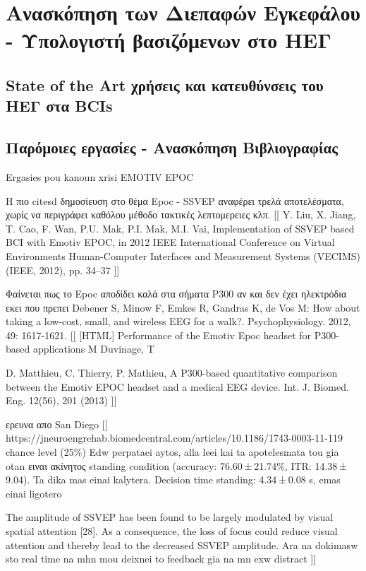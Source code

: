 \documentclass[11pt,a4paper,english,greek,twoside]{../Thesis}
\begin{document}
\chapter{Ανασκόπηση των Διεπαφών Εγκεφάλου - Υπολογιστή βασιζόμενων στο ΗΕΓ} \label{chap:survey}
\section{State of the Art χρήσεις και κατευθύνσεις του ΗΕΓ στα BCIs}

\section{Παρόμοιες εργασίες - Ανασκόπηση Βιβλιογραφίας}

Ergasies pou kanoun xrisi EMOTIV EPOC

Η πιο citesd δημοσίευση στο θέμα Epoc - SSVEP αναφέρει τρελά αποτελέσματα, χωρίς να περιγράφει καθόλου μέθοδο τακτικές λεπτομερειες κλπ.
[[
Y. Liu, X. Jiang, T. Cao, F. Wan, P.U. Mak, P.I. Mak, M.I. Vai, Implementation of SSVEP based BCI with Emotiv EPOC, in 2012 IEEE International Conference on Virtual Environments Human-Computer Interfaces and Measurement Systems (VECIMS) (IEEE, 2012), pp. 34–37
]]

Φαίνεται πως το Epoc αποδίδει καλά στα σήματα P300 αν και δεν έχει ηλεκτρόδια εκει που πρεπει Debener S, Minow F, Emkes R, Gandras K, de Vos M: How about taking a low-cost, small, and wireless EEG for a walk?. Psychophysiology. 2012, 49: 1617-1621.
[[
[HTML] Performance of the Emotiv Epoc headset for P300-based applications
M Duvinage, T

D. Matthieu, C. Thierry, P. Mathieu, A P300-based quantitative comparison between the Emotiv EPOC headset and a medical EEG device. Int. J. Biomed. Eng. 12(56), 201 (2013)
]]

ερευνα απο San Diego
[[
https://jneuroengrehab.biomedcentral.com/articles/10.1186/1743-0003-11-119
chance level (25\%) 
Edw perpataei aytos, alla leei kai ta apotelesmata tou gia otan ειναι ακίνητος
standing condition (accuracy: 76.60 ± 21.74\%, ITR: 14.38 ± 9.04).  Ta dika mas einai kalytera.
Decision time standing: 4.34 ± 0.08 s, emas einai ligotero

The amplitude of SSVEP has been found to be largely modulated by visual spatial attention [28]. As a consequence, the loss of focus could reduce visual attention and thereby lead to the decreased SSVEP amplitude.
Ara na dokimasw sto real time na mhn mou deixnei to feedback gia na mn exw distract
]]
\end{document}

